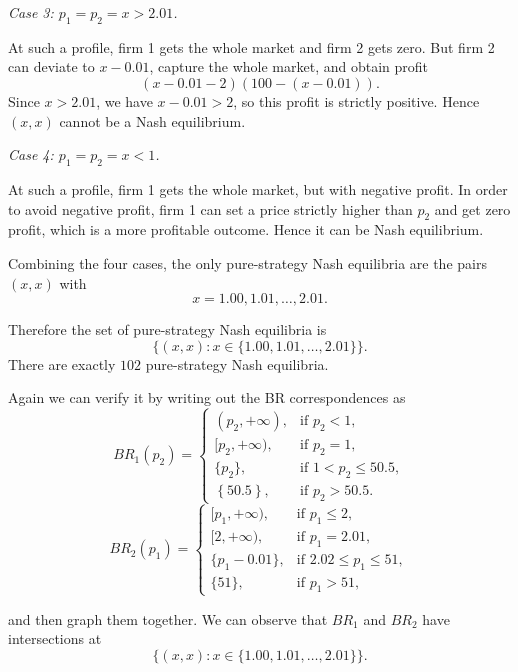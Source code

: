 \documentclass[12pt,a4paper]{article}
\begin{document}
\emph{Case 3: \(p_1=p_2=x>2.01\).}

At such a profile, firm 1 gets the whole market and firm 2 gets zero. But firm 2 can deviate to \(x-0.01\), capture the whole market, and obtain profit
\[
(x-0.01-2)(100-(x-0.01)).
\]
Since \(x>2.01\), we have \(x-0.01>2\), so this profit is strictly positive. Hence \((x,x)\) cannot be a Nash equilibrium.

\emph{Case 4: \(p_1=p_2=x<1\).}

At such a profile, firm 1 gets the whole market, but with negative profit. In order to avoid negative profit, firm 1 can set a price strictly higher than $p_2$ and get zero profit, which is a more profitable outcome. Hence it can be Nash equilibrium.

Combining the four cases, the only pure-strategy Nash equilibria are the pairs \((x,x)\) with
\[
x=1.00,1.01,\dots,2.01.
\]

Therefore the set of pure-strategy Nash equilibria is
\[
\{(x,x): x\in\{1.00,1.01,\dots,2.01\}\}.
\]
There are exactly $102$ pure-strategy Nash equilibria.

Again we can verify it by writing out the BR correspondences as
\[
  BR_1(p_2)=
    \begin{cases}
    (p_2,+\infty), & \text{if } p_2<1,\\
    [p_2,+\infty), & \text{if } p_2=1,\\
    \{p_2\}, & \text{if } 1<p_2\le 50.5,\\
    \left\{50.5\right\}, & \text{if } p_2>50.5.
  \end{cases}
\]
\[
  BR_2(p_1)=
    \begin{cases}
    [p_1,+\infty), & \text{if } p_1\le2,\\
    [2,+\infty), & \text{if } p_1 = 2.01,\\
    \{p_1-0.01\}, & \text{if } 2.02\le p_1\le 51,\\
    \{51\}, & \text{if } p_1>51,
  \end{cases}
\]

and then graph them together. We can observe that $BR_1$ and $BR_2$ have intersections at
\[
\{(x,x): x\in\{1.00,1.01,\dots,2.01\}\}.
\]
\end{document}

